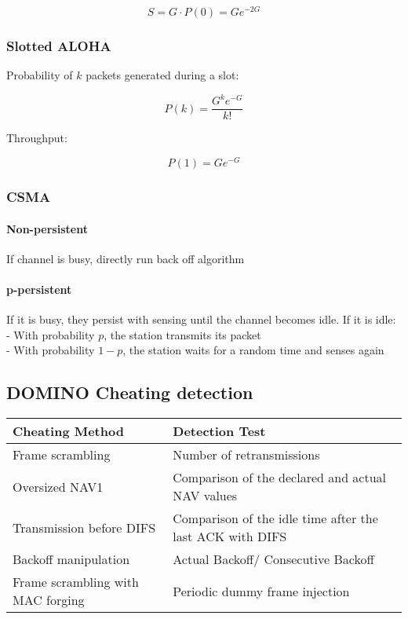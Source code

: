 \documentclass[10pt, a4paper,twocolumn]{scrartcl}
\begin{document}
\begin{equation*}
S = G \cdot P(0) = Ge^{-2G}
\end{equation*}

\subsubsection{Slotted ALOHA} 
Probability of $k$ packets generated during a slot:

\begin{equation*}
P(k) = \frac{G^ke^{-G}}{k!}
\end{equation*}

Throughput:

\begin{equation*}
P(1) = Ge^{-G}
\end{equation*}

\subsubsection{CSMA}
\paragraph{Non-persistent} If channel is busy, directly run back off algorithm
\paragraph{p-persistent} If it is busy, they persist with sensing until the channel becomes idle. If it is idle:\\
- With probability $p$, the station transmits its packet\\
- With probability $1-p$, the station waits for a random time and senses again

\subsection{DOMINO Cheating detection}
\begin{tabular}{|p{4cm}|p{5.2cm}|}
  \hline
  Cheating Method & Detection Test \\\hline
  Frame scrambling & Number of retransmissions \\
  Oversized NAV1 & Comparison of the declared and actual NAV values\\
  Transmission before DIFS & Comparison of the idle time after the last ACK with DIFS \\
  Backoff manipulation & Actual Backoff/ Consecutive Backoff \\
  Frame scrambling with MAC forging & Periodic dummy frame injection\\
   \hline
\end{tabular}
\end{document}
